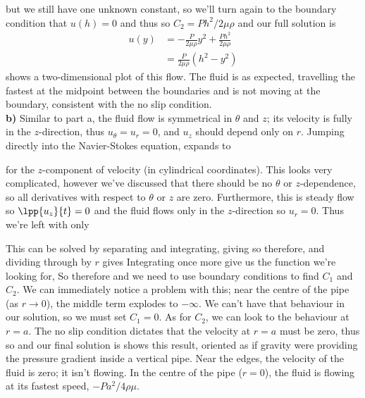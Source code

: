 \documentclass[12pt]{book}
\begin{document}
{but we still have one unknown constant, so we'll turn again to the boundary condition that $u(h)=0$ and thus
so $C_2 = Ph^2 / 2\mu\rho$ and our full solution is
\begin{align*}
u(y) &=  -\frac{P}{2\mu\rho}y^2 +\frac{Ph^2 }{ 2\mu\rho} \\
&=  \frac{P}{2\mu\rho}\left(h^2 - y^2\right)
\end{align*}
 shows a two-dimensional plot of this flow.  The fluid is as expected, travelling the fastest at the midpoint between the boundaries and is not moving at the boundary, consistent with the no slip condition.\\

\textbf{b) } Similar to part a, the fluid flow is symmetrical in $\theta$ and $z$; its velocity is fully in the $z$-direction, thus $u_\theta = u_r = 0$, and $u_z$ should depend only on $r$. Jumping directly into the Navier-Stokes equation,  expands to

for the $z$-component of velocity (in cylindrical coordinates).  This looks very complicated, however we've discussed that there should be no $\theta$ or $z$-dependence, so all derivatives with respect to $\theta$ or $z$ are zero.  Furthermore, this is steady flow so $\lpp{u_z}{t} = 0$ and the fluid flows only in the $z$-direction so $u_r = 0$.  Thus we're left with only

This can be solved by separating and integrating, giving
so therefore,
and dividing through by $r$ gives
Integrating once more give us the function we're looking for,
So therefore
and we need to use boundary conditions to find $C_1$ and $C_2$.  We can immediately notice a problem with this; near the centre of the pipe (as $r\to 0$), the middle term explodes to $-\infty$.  We can't have that behaviour in our solution, so we must set $C_1=0$.  As for $C_2$, we can look to the behaviour at $r=a$.  The no slip condition dictates that the velocity at $r=a$ must be zero, thus
so
and our final solution is
 shows this result, oriented as if gravity were providing the pressure gradient inside a vertical pipe.  Near the edges, the velocity of the fluid is zero; it isn't flowing.  In the centre of the pipe ($r=0$), the fluid is flowing at its fastest speed, $-Pa^2/4\rho\mu$.
}
\end{document}

